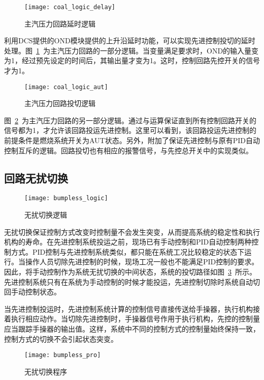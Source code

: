 \begin{figure}[!hbt]
\centering
\texttt{[image: coal\_logic\_delay]}
\caption{主汽压力回路延时逻辑} \label{fig:coal_logic_delay}
\end{figure}
 
利用DCS提供的OND模块提供的上升沿延时功能，可以实现先进控制投切的延时处理。图~\ref{fig:coal_logic_delay}~为主汽压力回路的一部分逻辑。当变量满足要求时，OND的输入量变为1，经过预先设定的时间后，其输出量才变为1。这时，控制回路先控开关的信号才为1。

\begin{figure}[!hbt]
\centering
\texttt{[image: coal\_logic\_aut]}
\caption{主汽压力回路投切逻辑} \label{fig:coal_logic_aut}
\end{figure}

图~\ref{fig:coal_logic_aut}~为主汽压力回路的另一部分逻辑。通过与运算保证直到所有控制回路开关的信号都为1，才允许该回路投运先进控制。这里可以看到，该回路投运先进控制的前提条件是燃烧系统开关为AUT状态。另外，附加了保证先进控制与原有PID自动控制互斥的逻辑。回路投切也有相应的报警信号，与先控总开关中的实现类似。
  
\subsection{回路无扰切换}

\begin{figure}[!hbt]
\centering
\texttt{[image: bumpless\_logic]}
\caption{无扰切换逻辑} \label{fig:bumpless_logic}
\end{figure}
 
无扰切换保证控制方式改变时控制量不会发生突变，从而提高系统的稳定性和执行机构的寿命。在先进控制系统投运之前，现场已有手动控制和PID自动控制两种控制方式。PID控制与先进控制系统类似，都只能在系统工况比较稳定的状态下运行。当操作人员切除先进控制的时候，现场工况一般也不能满足PID控制的要求。因此，将手动控制作为系统无扰切换的中间状态，系统的投切路径如图~\ref{fig:bumpless_logic}~所示。先进控制系统只有在系统为手动控制的时候才能投运，先进控制切除时系统自动切回手动控制状态。

当先进控制投运时，先进控制系统计算的控制信号直接传送给手操器，执行机构接着执行相应动作。当切除先进控制时，手操器信号作用于执行机构，先控的控制量应当跟踪手操器的输出值。这样，系统中不同的控制方式的控制量始终保持一致，控制方式的切换不会引起状态突变。

\begin{figure}[!hbt]
\centering
\texttt{[image: bumpless\_pro]}
\caption{无扰切换程序} \label{fig:bumpless_pro}
\end{figure}

